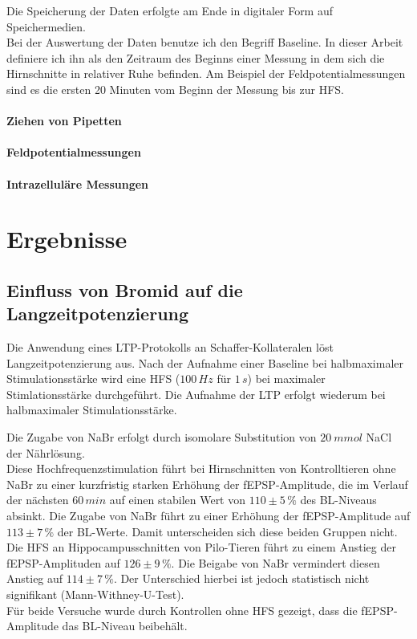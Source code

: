 \documentclass[a4paper,11pt]{report}
\begin{document}
{Die Speicherung der Daten erfolgte am Ende in digitaler Form auf Speichermedien.\\

Bei der Auswertung der Daten benutze ich den Begriff Baseline. In dieser Arbeit definiere ich ihn als den Zeitraum des Beginns einer Messung in dem sich die Hirnschnitte in relativer Ruhe befinden. Am Beispiel der Feldpotentialmessungen sind es die ersten 20 Minuten vom Beginn der Messung bis zur HFS. 

\subsubsection{Ziehen von Pipetten}

\subsubsection{Feldpotentialmessungen}

\subsubsection{Intrazelluläre Messungen}

\chapter{Ergebnisse}
\section{Einfluss von Bromid auf die Langzeitpotenzierung}
Die Anwendung eines LTP-Protokolls an Schaffer-Kollateralen  löst Langzeitpotenzierung aus. Nach der Aufnahme einer Baseline bei halbmaximaler Stimulationsstärke wird eine HFS ($100\,Hz$ für $1\,s$) bei maximaler Stimlationsstärke durchgeführt. Die Aufnahme der LTP erfolgt wiederum bei halbmaximaler Stimulationsstärke.

Die Zugabe von NaBr erfolgt durch isomolare Substitution von $20\: mmol$ NaCl der Nährlösung.\\

 Diese Hochfrequenzstimulation führt bei Hirnschnitten von Kontrolltieren ohne NaBr zu einer kurzfristig starken Erhöhung der fEPSP-Amplitude, die im Verlauf der nächsten $60\, min$ auf einen stabilen Wert von $110 \pm 5\,\%$ des  BL-Niveaus absinkt.
Die Zugabe von NaBr führt zu einer Erhöhung der fEPSP-Amplitude auf $113 \pm 7\,\%$ der BL-Werte. Damit  unterscheiden sich diese beiden Gruppen nicht.\\
Die HFS an Hippocampusschnitten von Pilo-Tieren führt zu einem Anstieg der fEPSP-Amplituden auf $126 \pm 9\,\%$. Die Beigabe von NaBr vermindert diesen Anstieg auf $114 \pm 7\,\%$. Der Unterschied hierbei ist jedoch statistisch nicht signifikant (Mann-Withney-U-Test).\\
Für beide Versuche wurde durch Kontrollen ohne HFS gezeigt, dass die fEPSP-Amplitude das BL-Niveau beibehält.\

}
\end{document}

